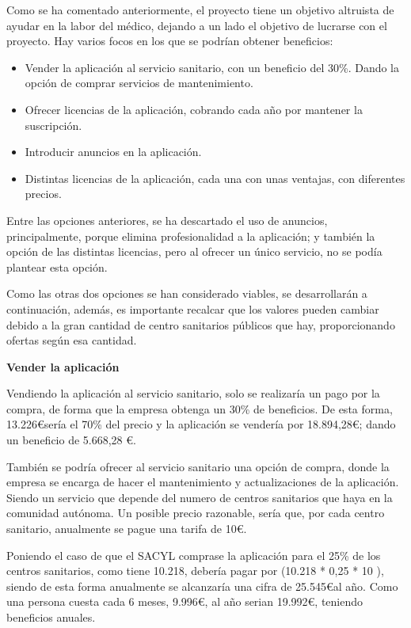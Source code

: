 Como se ha comentado anteriormente, el proyecto tiene un objetivo altruista de ayudar en la labor del médico, dejando a un lado el objetivo de lucrarse con el proyecto. Hay varios focos en los que se podrían obtener beneficios:
\begin{itemize}
    \item Vender la aplicación al servicio sanitario, con un beneficio del 30\%. Dando la opción de comprar servicios de mantenimiento.
    \item Ofrecer licencias de la aplicación, cobrando cada año por mantener la suscripción.
    \item Introducir anuncios en la aplicación.
    \item Distintas licencias de la aplicación, cada una con unas ventajas, con diferentes precios.
\end{itemize}

Entre las opciones anteriores, se ha descartado el uso de anuncios, principalmente, porque elimina profesionalidad a la aplicación; y también la opción de las distintas licencias, pero al ofrecer un único servicio, no se podía plantear esta opción.

Como las otras dos opciones se han considerado viables, se desarrollarán a continuación, además, es importante recalcar que los valores pueden  cambiar debido a la gran cantidad de centro sanitarios públicos que hay, proporcionando ofertas según esa cantidad.

\textbf{Vender la aplicación}

Vendiendo la aplicación al servicio sanitario, solo se realizaría un pago por la compra, de forma que la empresa obtenga un 30\% de beneficios.
De esta forma, 13.226\euro  sería el 70\% del precio y la aplicación se vendería por 18.894,28\euro; dando un beneficio de 5.668,28 \euro. 

También se podría ofrecer al servicio sanitario una opción de compra, donde la empresa se encarga de hacer el mantenimiento y actualizaciones de la aplicación. Siendo un servicio que depende del numero de centros sanitarios que haya en la comunidad autónoma. Un posible precio razonable, sería que, por cada centro sanitario, anualmente se pague una tarifa de 10\euro. 

Poniendo el caso de que el SACYL comprase la aplicación para el 25\% de los centros sanitarios, como tiene 10.218,
debería pagar por (10.218 * 0,25 * 10 ), siendo de esta forma anualmente se alcanzaría una cifra de 25.545\euro  al año.
Como una persona cuesta cada 6 meses, 9.996\euro, al año serian 19.992\euro, teniendo beneficios anuales.


